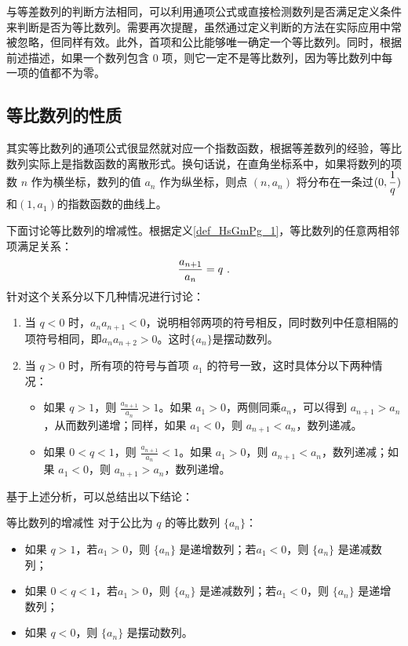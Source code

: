 与等差数列的判断方法相同，可以利用通项公式或直接检测数列是否满足定义条件来判断是否为等比数列。需要再次提醒，虽然通过定义判断的方法在实际应用中常被忽略，但同样有效。此外，首项和公比能够唯一确定一个等比数列。同时，根据前述描述，如果一个数列包含 $0$ 项，则它一定不是等比数列，因为等比数列中每一项的值都不为零。

\subsection{等比数列的性质}

其实等比数列的通项公式很显然就对应一个指数函数，根据等差数列的经验，等比数列实际上是指数函数的离散形式。换句话说，在直角坐标系中，如果将数列的项数 $n$ 作为横坐标，数列的值 $a_n$ 作为纵坐标，则点 $(n, a_n)$ 将分布在一条过$\displaystyle(0,{1\over q})$和$(1,a_1)$的指数函数的曲线上。

下面讨论等比数列的增减性。根据定义\autoref{def_HsGmPg_1}，等比数列的任意两相邻项满足关系：
\begin{equation}
{a_{n+1}\over a_n}=q~.
\end{equation}
针对这个关系分以下几种情况进行讨论：
\begin{enumerate}
\item 当 $q < 0$ 时，$a_n a_{n+1} < 0$，说明相邻两项的符号相反，同时数列中任意相隔的项符号相同，即$a_na_{n+2}>0$。这时$\{a_n\}$是摆动数列。
\item 当 $q > 0$ 时，所有项的符号与首项 $a_1$ 的符号一致，这时具体分以下两种情况：
\begin{itemize}
\item 如果 $q > 1$，则 $\displaystyle\frac{a_{n+1}}{a_n} > 1$。如果 $a_1 > 0$，两侧同乘$a_n$，可以得到 $a_{n+1} > a_n$，从而数列递增；同样，如果 $a_1 < 0$，则 $a_{n+1} < a_n$，数列递减。
\item 如果 $0 < q < 1$，则 $\displaystyle\frac{a_{n+1}}{a_n} < 1$。如果 $a_1 > 0$，则 $a_{n+1} < a_n$，数列递减；如果 $a_1 < 0$，则 $a_{n+1} > a_n$，数列递增。
\end{itemize}	
\end{enumerate}

基于上述分析，可以总结出以下结论：
\begin{corollary}{等比数列的增减性}
对于公比为 $q$ 的等比数列 $\{a_n\}$：
\begin{itemize}
\item 如果 $q > 1$，若$a_1>0$，则 $\{a_n\}$ 是递增数列；若$a_1<0$，则 $\{a_n\}$ 是递减数列；
\item 如果 $0< q < 1$，若$a_1>0$，则 $\{a_n\}$ 是递减数列；若$a_1<0$，则 $\{a_n\}$ 是递增数列；
\item 如果 $q<0$，则 $\{a_n\}$ 是摆动数列。
\end{itemize}
\end{corollary}


